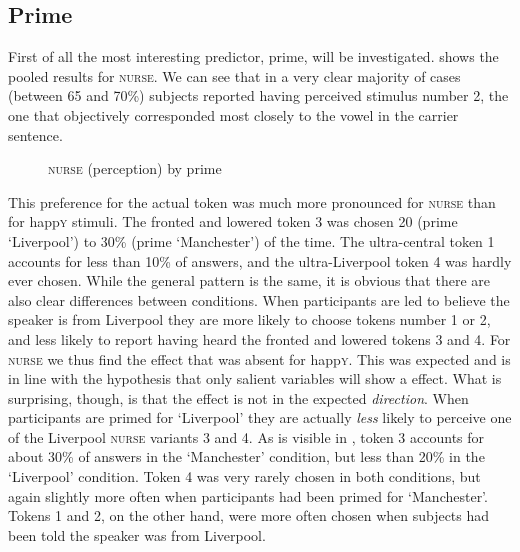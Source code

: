 \subsection{Prime}
\label{sec.perc_res.nurse.prime}

First of all the most interesting predictor, prime, will be investigated.
 shows the pooled results for \textsc{nurse}.
We can see that in a very clear majority of cases (between 65 and 70\%) subjects reported having perceived stimulus number 2, the one that objectively corresponded most closely to the vowel in the carrier sentence.

\begin{figure}
	
		\resizebox{.49\linewidth}{!}{} 
	\caption{\textsc{nurse} (perception) by prime}
	\label{fig.bar.nurse.tot.ext}
\end{figure}

This preference for the actual token was much more pronounced for \textsc{nurse} than for happ\textsc{y} stimuli.
The fronted and lowered token 3 was chosen 20 (prime `Liverpool') to 30\% (prime `Manchester') of the time.
The ultra-central token 1 accounts for less than 10\% of answers, and the ultra-Liverpool token 4 was hardly ever chosen.
While the general pattern is the same, it is obvious that there are also clear differences between  conditions.
When participants are led to believe the speaker is from Liverpool they are more likely to choose tokens number 1 or 2, and less likely to report having heard the fronted and lowered tokens 3 and 4.
For \textsc{nurse} we thus find the  effect that was absent for happ\textsc{y}.
This was expected and is in line with the hypothesis that only salient variables will show a  effect.
What is surprising, though, is that the  effect is not in the expected \emph{direction}.
When participants are primed for `Liverpool' they are actually \emph{less} likely to perceive one of the Liverpool \textsc{nurse} variants 3 and 4.
As is visible in , token 3 accounts for about 30\% of answers in the `Manchester' condition, but less than 20\% in the `Liverpool' condition.
Token 4 was very rarely chosen in both conditions, but again slightly more often when participants had been primed for `Manchester'.
Tokens 1 and 2, on the other hand, were more often chosen when subjects had been told the speaker was from Liverpool.

